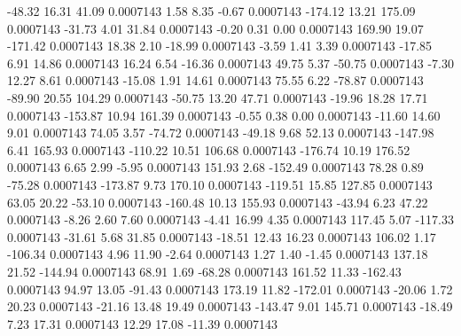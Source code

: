       -48.32       16.31       41.09     0.0007143
        1.58        8.35       -0.67     0.0007143
     -174.12       13.21      175.09     0.0007143
      -31.73        4.01       31.84     0.0007143
       -0.20        0.31        0.00     0.0007143
      169.90       19.07     -171.42     0.0007143
       18.38        2.10      -18.99     0.0007143
       -3.59        1.41        3.39     0.0007143
      -17.85        6.91       14.86     0.0007143
       16.24        6.54      -16.36     0.0007143
       49.75        5.37      -50.75     0.0007143
       -7.30       12.27        8.61     0.0007143
      -15.08        1.91       14.61     0.0007143
       75.55        6.22      -78.87     0.0007143
      -89.90       20.55      104.29     0.0007143
      -50.75       13.20       47.71     0.0007143
      -19.96       18.28       17.71     0.0007143
     -153.87       10.94      161.39     0.0007143
       -0.55        0.38        0.00     0.0007143
      -11.60       14.60        9.01     0.0007143
       74.05        3.57      -74.72     0.0007143
      -49.18        9.68       52.13     0.0007143
     -147.98        6.41      165.93     0.0007143
     -110.22       10.51      106.68     0.0007143
     -176.74       10.19      176.52     0.0007143
        6.65        2.99       -5.95     0.0007143
      151.93        2.68     -152.49     0.0007143
       78.28        0.89      -75.28     0.0007143
     -173.87        9.73      170.10     0.0007143
     -119.51       15.85      127.85     0.0007143
       63.05       20.22      -53.10     0.0007143
     -160.48       10.13      155.93     0.0007143
      -43.94        6.23       47.22     0.0007143
       -8.26        2.60        7.60     0.0007143
       -4.41       16.99        4.35     0.0007143
      117.45        5.07     -117.33     0.0007143
      -31.61        5.68       31.85     0.0007143
      -18.51       12.43       16.23     0.0007143
      106.02        1.17     -106.34     0.0007143
        4.96       11.90       -2.64     0.0007143
        1.27        1.40       -1.45     0.0007143
      137.18       21.52     -144.94     0.0007143
       68.91        1.69      -68.28     0.0007143
      161.52       11.33     -162.43     0.0007143
       94.97       13.05      -91.43     0.0007143
      173.19       11.82     -172.01     0.0007143
      -20.06        1.72       20.23     0.0007143
      -21.16       13.48       19.49     0.0007143
     -143.47        9.01      145.71     0.0007143
      -18.49        7.23       17.31     0.0007143
       12.29       17.08      -11.39     0.0007143
